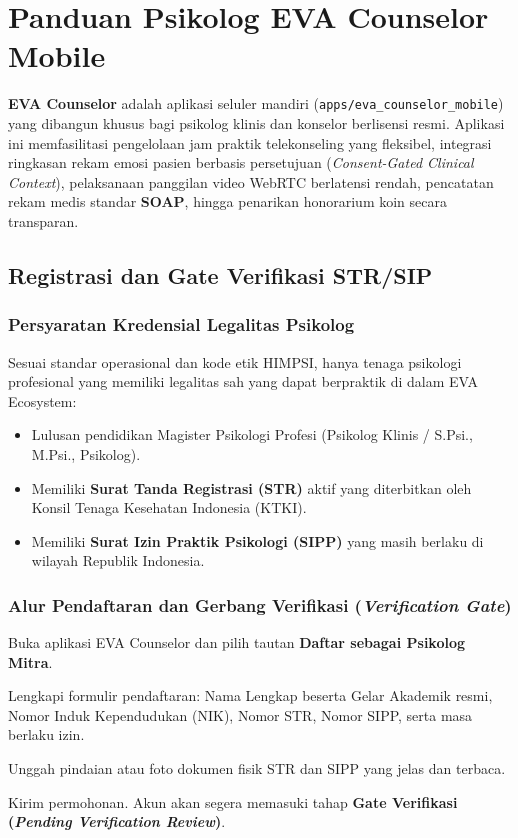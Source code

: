 \chapter{Panduan Psikolog EVA Counselor Mobile}
\label{chap:eva-counselor}

\textbf{EVA Counselor} adalah aplikasi seluler mandiri (\texttt{apps/eva\_counselor\_mobile}) yang dibangun khusus bagi psikolog klinis dan konselor berlisensi resmi. Aplikasi ini memfasilitasi pengelolaan jam praktik telekonseling yang fleksibel, integrasi ringkasan rekam emosi pasien berbasis persetujuan (\textit{Consent-Gated Clinical Context}), pelaksanaan panggilan video WebRTC berlatensi rendah, pencatatan rekam medis standar \textbf{SOAP}, hingga penarikan honorarium koin secara transparan.

\section{Registrasi dan Gate Verifikasi STR/SIP}

\subsection{Persyaratan Kredensial Legalitas Psikolog}
Sesuai standar operasional dan kode etik HIMPSI, hanya tenaga psikologi profesional yang memiliki legalitas sah yang dapat berpraktik di dalam EVA Ecosystem:
\begin{itemize}[leftmargin=1.4em]
  \item Lulusan pendidikan Magister Psikologi Profesi (Psikolog Klinis / S.Psi., M.Psi., Psikolog).
  \item Memiliki \textbf{Surat Tanda Registrasi (STR)} aktif yang diterbitkan oleh Konsil Tenaga Kesehatan Indonesia (KTKI).
  \item Memiliki \textbf{Surat Izin Praktik Psikologi (SIPP)} yang masih berlaku di wilayah Republik Indonesia.
\end{itemize}

\subsection{Alur Pendaftaran dan Gerbang Verifikasi (\textit{Verification Gate})}
\begin{steplist}
  \item Buka aplikasi EVA Counselor dan pilih tautan \textbf{Daftar sebagai Psikolog Mitra}.
  \item Lengkapi formulir pendaftaran: Nama Lengkap beserta Gelar Akademik resmi, Nomor Induk Kependudukan (NIK), Nomor STR, Nomor SIPP, serta masa berlaku izin.
  \item Unggah pindaian atau foto dokumen fisik STR dan SIPP yang jelas dan terbaca.
  \item Kirim permohonan. Akun akan segera memasuki tahap \textbf{Gate Verifikasi (\textit{Pending Verification Review})}.
\end{steplist}

